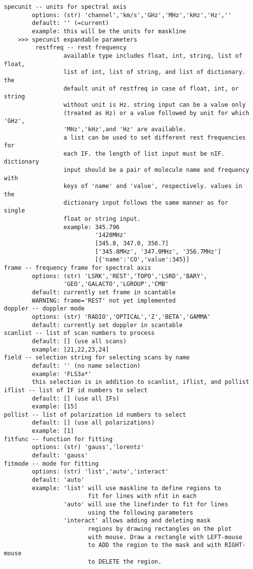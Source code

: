 \begin{verbatim}
specunit -- units for spectral axis
        options: (str) 'channel','km/s','GHz','MHz','kHz','Hz',''
        default: '' (=current)
        example: this will be the units for maskline
    >>> specunit expandable parameters
         restfreq -- rest frequency
                 available type includes float, int, string, list of float, 
                 list of int, list of string, and list of dictionary. the 
                 default unit of restfreq in case of float, int, or string 
                 without unit is Hz. string input can be a value only 
                 (treated as Hz) or a value followed by unit for which 'GHz',
                 'MHz','kHz',and 'Hz' are available. 
                 a list can be used to set different rest frequencies for 
                 each IF. the length of list input must be nIF. dictionary 
                 input should be a pair of molecule name and frequency with 
                 keys of 'name' and 'value', respectively. values in the 
                 dictionary input follows the same manner as for single 
                 float or string input. 
                 example: 345.796
                          '1420MHz'
                          [345.8, 347.0, 356.7]
                          ['345.8MHz', '347.0MHz', '356.7MHz']
                          [{'name':'CO','value':345}]
frame -- frequency frame for spectral axis
        options: (str) 'LSRK','REST','TOPO','LSRD','BARY',
                 'GEO','GALACTO','LGROUP','CMB'
        default: currently set frame in scantable
        WARNING: frame='REST' not yet implemented
doppler -- doppler mode
        options: (str) 'RADIO','OPTICAL','Z','BETA','GAMMA'
        default: currently set doppler in scantable
scanlist -- list of scan numbers to process
        default: [] (use all scans)
        example: [21,22,23,24]
field -- selection string for selecting scans by name
        default: '' (no name selection)
        example: 'FLS3a*'
        this selection is in addition to scanlist, iflist, and pollist
iflist -- list of IF id numbers to select
        default: [] (use all IFs)
        example: [15]
pollist -- list of polarization id numbers to select
        default: [] (use all polarizations)
        example: [1]
fitfunc -- function for fitting
        options: (str) 'gauss','lorentz'
        default: 'gauss'
fitmode -- mode for fitting
        options: (str) 'list','auto','interact'
        default: 'auto'
        example: 'list' will use maskline to define regions to
                        fit for lines with nfit in each
                 'auto' will use the linefinder to fit for lines
                        using the following parameters
                 'interact' allows adding and deleting mask 
                        regions by drawing rectangles on the plot 
                        with mouse. Draw a rectangle with LEFT-mouse 
                        to ADD the region to the mask and with RIGHT-mouse 
                        to DELETE the region. 


\end{verbatim}
